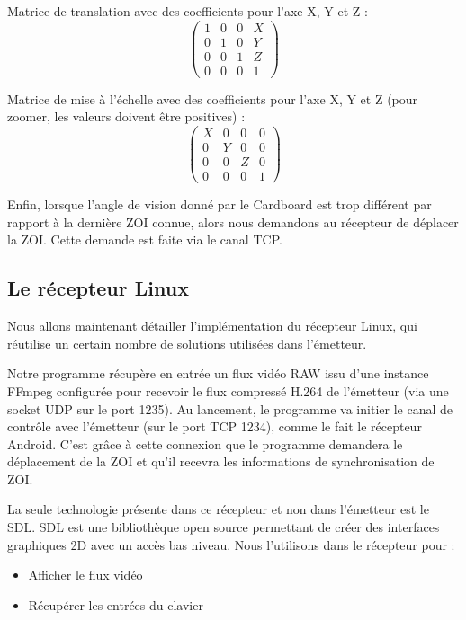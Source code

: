 \documentclass[11pt,a4paper]{article}
\begin{document}
\bigbreak
Matrice de translation avec des coefficients pour l'axe X, Y et Z :
\[ \left( \begin{array}{cccc}
1 & 0 & 0 & X \\
0 & 1 & 0 & Y \\
0 & 0 & 1 & Z \\
0 & 0 & 0 & 1 \end{array} \right)\] 

\bigbreak
Matrice de mise à l'échelle avec des coefficients pour l'axe X, Y et Z (pour zoomer, les valeurs doivent être positives) :
\[ \left( \begin{array}{cccc}
X & 0 & 0 & 0 \\
0 & Y & 0 & 0 \\
0 & 0 & Z & 0 \\
0 & 0 & 0 & 1 \end{array} \right)\] 

\bigbreak
Enfin, lorsque l'angle de vision donné par le Cardboard est trop différent par rapport à la dernière ZOI connue, alors nous demandons au récepteur de déplacer la ZOI.
Cette demande est faite via le canal TCP.

\subsection{Le récepteur Linux}
Nous allons maintenant détailler l'implémentation du récepteur Linux, qui réutilise un certain nombre de solutions utilisées dans l'émetteur.

\bigbreak
Notre programme récupère en entrée un flux vidéo RAW issu d'une instance FFmpeg configurée pour recevoir le flux compressé H.264 de l'émetteur (via une socket UDP sur le port 1235).
Au lancement, le programme va initier le canal de contrôle avec l'émetteur (sur le port TCP 1234), comme le fait le récepteur Android.
C'est grâce à cette connexion que le programme demandera le déplacement de la ZOI et qu'il recevra les informations de synchronisation de ZOI.

\bigbreak
La seule technologie présente dans ce récepteur et non dans l'émetteur est le SDL.
SDL est une bibliothèque open source permettant de créer des interfaces graphiques 2D avec un accès bas niveau.
Nous l'utilisons dans le récepteur pour :

\bigbreak
\begin{itemize}
\item{Afficher le flux vidéo}
\item{Récupérer les entrées du clavier}
\end{itemize}
\end{document}
